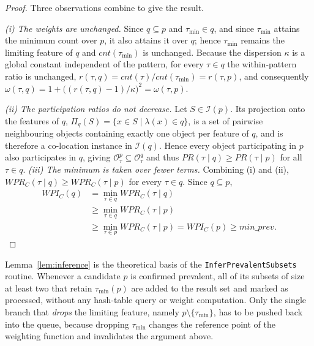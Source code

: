 \documentclass[12pt, letterpaper]{template}
\theoremstyle{definition}
\begin{document}
\begin{proof}
\renewcommand{\qedsymbol}{}
Three observations combine to give the result.

\emph{(i) The weights are unchanged.} Since $q \subseteq p$ and
$\tau_{\min} \in q$, and since $\tau_{\min}$ attains the minimum count over
$p$, it also attains it over $q$; hence $\tau_{\min}$ remains the limiting
feature of $q$ and $cnt(\tau_{\min})$ is unchanged. Because the dispersion
$\kappa$ is a global constant independent of the pattern, for every
$\tau \in q$ the within-pattern ratio is unchanged,
$r(\tau,q) = cnt(\tau)/cnt(\tau_{\min}) = r(\tau,p)$, and consequently
$\omega(\tau,q) = 1 + \big((r(\tau,q)-1)/\kappa\big)^2
= \omega(\tau,p)$.

\emph{(ii) The participation ratios do not decrease.} Let
$S \in \mathcal{I}(p)$. Its projection onto the features of $q$,
$\Pi_q(S) = \{x \in S \mid \lambda(x) \in q\}$, is a set of pairwise
neighbouring objects containing exactly one object per feature of $q$, and
is therefore a co-location instance in $\mathcal{I}(q)$. Hence every object
participating in $p$ also participates in $q$, giving
$\mathcal{O}_\tau^{p} \subseteq \mathcal{O}_\tau^{q}$ and thus
$PR(\tau \mid q) \ge PR(\tau \mid p)$ for all $\tau \in q$.
\newpage
\emph{(iii) The minimum is taken over fewer terms.} Combining (i) and (ii),
$WPR_C(\tau \mid q) \ge WPR_C(\tau \mid p)$ for every $\tau \in q$. Since
$q \subseteq p$,
\begin{equation*}
\begin{aligned}
WPI_C(q)
&= \min_{\tau \in q} WPR_C(\tau \mid q) \\
&\ge \min_{\tau \in q} WPR_C(\tau \mid p) \\
&\ge \min_{\tau \in p} WPR_C(\tau \mid p)
 = WPI_C(p) \ge min\_prev.
\end{aligned}
\end{equation*}
\end{proof}

Lemma~\ref{lem:inference} is the theoretical basis of the \texttt{InferPrevalentSubsets}
routine. Whenever a candidate $p$ is confirmed prevalent, all of its subsets of size at least
two that retain $\tau_{\min}(p)$ are added to the result set and marked as processed, without
any hash-table query or weight computation. Only the single branch that \emph{drops} the
limiting feature, namely $p \setminus \{\tau_{\min}\}$, has to be pushed back into the queue,
because dropping $\tau_{\min}$ changes the reference point of the weighting function and
invalidates the argument above.
\end{document}
